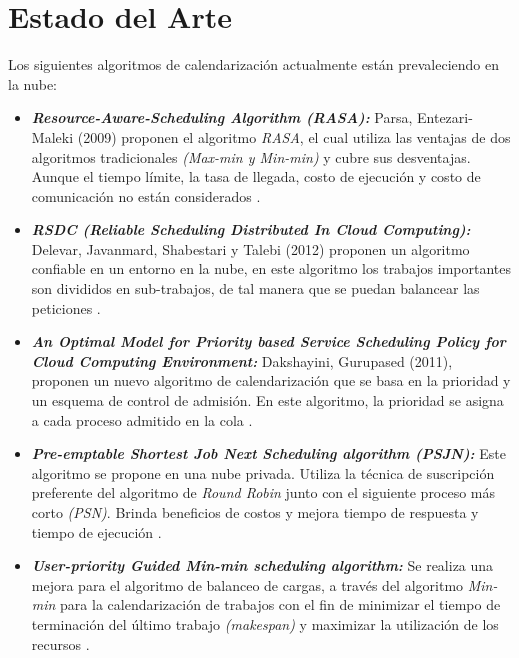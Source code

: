 \documentclass[jou,apacite]{apa6}
\begin{document}
\section{Estado del Arte}

Los siguientes algoritmos de calendarizaci\'on actualmente est\'an prevaleciendo en la nube:
\begin{itemize}
	\item \textit{\textbf{Resource-Aware-Scheduling Algorithm (RASA):}} Parsa, Entezari-Maleki (2009) proponen el algoritmo \textit{RASA}, el cual utiliza las ventajas de dos algoritmos tradicionales \textit{(Max-min y Min-min)} y cubre sus desventajas. Aunque el tiempo l\'imite, la tasa de llegada, costo de ejecución y costo de comunicaci\'on no est\'an considerados \cite{parsa2009rasa}.
	
	
	\item \textit{\textbf{RSDC (Reliable Scheduling Distributed In Cloud Computing):}} Delevar, Javanmard, Shabestari y Talebi (2012) proponen un algoritmo confiable en un entorno en la nube, en este algoritmo los trabajos importantes son divididos en sub-trabajos, de tal manera que se puedan balancear las peticiones \cite{delavar2012rsdc}.
	
	
	\item \textit{\textbf{An Optimal Model for Priority based Service Scheduling Policy for Cloud Computing Environment:}} Dakshayini, Gurupased (2011), proponen un nuevo algoritmo de calendarizaci\'on que se basa en la prioridad y un esquema de control de admisi\'on. En este algoritmo, la prioridad se asigna a cada proceso admitido en la cola \cite{dakshayini2011optimal}. 
	
	
	\item \textit{\textbf{Pre-emptable Shortest Job Next Scheduling algorithm (PSJN):}}  Este algoritmo se propone en una nube privada. Utiliza la t\'ecnica de suscripci\'on preferente del algoritmo de \textit{Round Robin} junto con el siguiente proceso m\'as corto \textit{(PSN)}. Brinda beneficios de costos y mejora tiempo de respuesta y tiempo de ejecuci\'on \cite{nishant}. 
	
	
	\item \textit{\textbf{User-priority Guided Min-min scheduling algorithm:}} Se realiza una mejora para el algoritmo de balanceo de cargas, a trav\'es del algoritmo \textit{Min-min} para la calendarizaci\'on de trabajos con el fin de minimizar el tiempo de terminaci\'on del \'ultimo trabajo \textit{(makespan)} y maximizar la utilizaci\'on de los recursos \cite{chen2013user}. 
\end{itemize}
\end{document}
